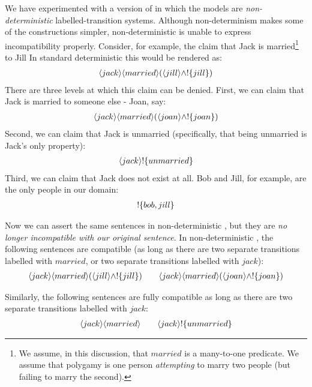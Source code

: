 We have experimented with a version of \cathoristic{} in which the models are
\emph{non-deterministic} labelled-transition systems.  Although
non-determinism makes some of the constructions simpler,
non-deterministic \cathoristic{} is unable to express incompatibility properly.
Consider, for example, the claim that Jack is married\footnote{We assume, in this discussion, that $married$ is a many-to-one predicate. We assume that polygamy is one person \emph{attempting} to marry two people (but failing to marry the second).} to Jill
In standard deterministic \cathoristic{} this would be rendered as:
\begin{eqnarray*}
  \langle jack \rangle \langle married \rangle (\langle jill \rangle \land ! \{jill\})
\end{eqnarray*}
There are three levels at which this claim can be denied.
First, we can claim that Jack is married to someone else - Joan, say:
\begin{eqnarray*}
   \langle jack \rangle \langle married \rangle (\langle joan \rangle \land ! \{joan\})
\end{eqnarray*}
Second, we can claim that Jack is unmarried (specifically, that being unmarried is Jack's only property):
\begin{eqnarray*}
  \langle jack \rangle !\{unmarried\}
\end{eqnarray*}
Third, we can claim that Jack does not exist at all. Bob and Jill, for example, are the only people in our domain:
\begin{eqnarray*}
  ! \{bob, jill\}
\end{eqnarray*}

Now we can assert the same sentences in non-deterministic \cathoristic{}, but they
are \emph{no longer incompatible with our original sentence}.  In
non-deterministic \cathoristic{}, the following sentences are compatible (as long
as there are two separate transitions labelled with $married$, or two
separate transitions labelled with $jack$):
\begin{eqnarray*}
  \langle jack \rangle \langle married \rangle (\langle jill \rangle \land ! \{jill\}) 
      \qquad
  \langle jack \rangle \langle married \rangle (\langle joan \rangle \land ! \{joan\})
\end{eqnarray*}

\NI Similarly, the following sentences are fully compatible as long as
there are two separate transitions labelled with $jack$:
\begin{eqnarray*}
  \langle jack \rangle \langle married \rangle \qquad
  \langle jack \rangle ! \{unmarried\}
\end{eqnarray*}

